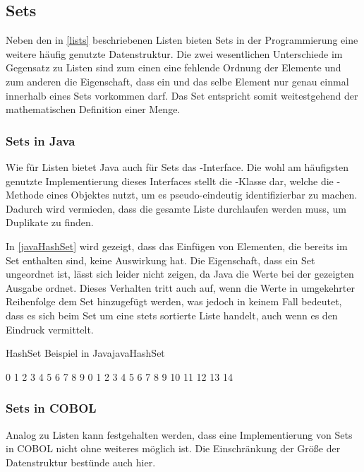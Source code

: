 \subsection{Sets}
Neben den in \autoref{lists} beschriebenen Listen bieten Sets in der Programmierung eine weitere häufig genutzte Datenstruktur. Die zwei wesentlichen Unterschiede im Gegensatz zu Listen sind zum einen eine fehlende Ordnung der Elemente und zum anderen die Eigenschaft, dass ein und das selbe Element nur genau einmal innerhalb eines Sets vorkommen darf. Das Set entspricht somit weitestgehend der mathematischen Definition einer Menge.

\subsubsection*{Sets in Java}
Wie für Listen bietet Java auch für Sets das -Interface. Die wohl am häufigsten genutzte Implementierung dieses Interfaces stellt die -Klasse dar, welche die -Methode eines Objektes nutzt, um es pseudo-eindeutig identifizierbar zu machen. Dadurch wird vermieden, dass die gesamte Liste durchlaufen werden muss, um Duplikate zu finden.

In \autoref{javaHashSet} wird gezeigt, dass das Einfügen von Elementen, die bereits im Set enthalten sind, keine Auswirkung hat. Die Eigenschaft, dass ein Set ungeordnet ist, lässt sich leider nicht zeigen, da Java die Werte bei der gezeigten Ausgabe ordnet. Dieses Verhalten tritt auch auf, wenn die Werte in umgekehrter Reihenfolge dem Set hinzugefügt werden, was jedoch in keinem Fall bedeutet, dass es sich beim Set um eine stets sortierte Liste handelt, auch wenn es den Eindruck vermittelt.

\begin{codeWithCaption}{HashSet Beispiel in Java}{javaHashSet}
     \cFollow
\begin{shellwindow}
0 1 2 3 4 5 6 7 8 9 
0 1 2 3 4 5 6 7 8 9 10 11 12 13 14 
\end{shellwindow}
\end{codeWithCaption}

\subsubsection*{Sets in COBOL}
Analog zu Listen kann festgehalten werden, dass eine Implementierung von Sets in COBOL nicht ohne weiteres möglich ist. Die Einschränkung der Größe der Datenstruktur bestünde auch hier. 

